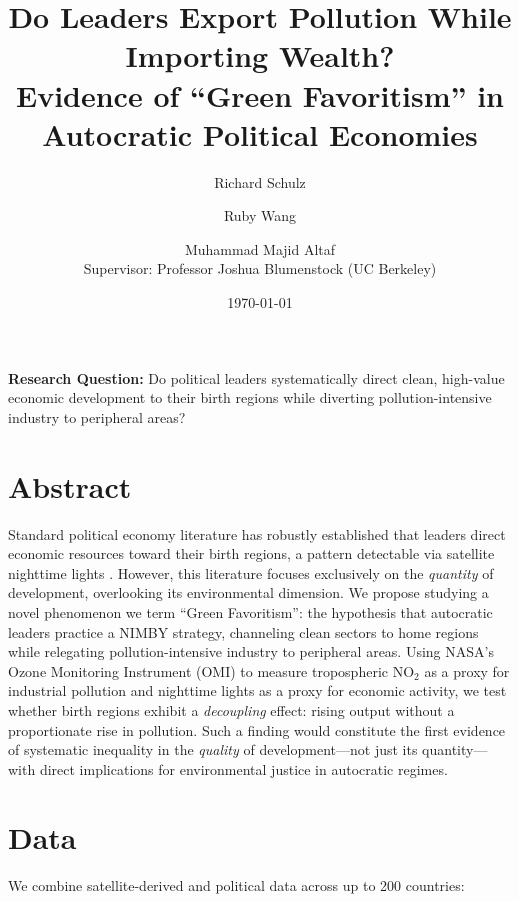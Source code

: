 \documentclass[12pt]{article}
\title{\textbf{Do Leaders Export Pollution While Importing Wealth?}\\[0.5em]
\large Evidence of ``Green Favoritism'' in Autocratic Political Economies}
\author{Richard Schulz \and Ruby Wang \and Muhammad Majid Altaf\\[0.5em]
\small Supervisor: Professor Joshua Blumenstock (UC Berkeley)}
\date{\today}
\begin{document}
\maketitle

\noindent\textbf{Research Question:} Do political leaders systematically direct clean, high-value economic development to their birth regions while diverting pollution-intensive industry to peripheral areas?

\section*{Abstract}

Standard political economy literature has robustly established that leaders direct economic resources toward their birth regions, a pattern detectable via satellite nighttime lights \parencite{HodlerRaschky2014, Bora2025}. However, this literature focuses exclusively on the \textit{quantity} of development, overlooking its environmental dimension. We propose studying a novel phenomenon we term ``Green Favoritism'': the hypothesis that autocratic leaders practice a NIMBY strategy, channeling clean sectors to home regions while relegating pollution-intensive industry to peripheral areas. Using NASA's Ozone Monitoring Instrument (OMI) to measure tropospheric NO$_2$ as a proxy for industrial pollution and nighttime lights as a proxy for economic activity, we test whether birth regions exhibit a \textit{decoupling} effect: rising output without a proportionate rise in pollution. Such a finding would constitute the first evidence of systematic inequality in the \textit{quality} of development---not just its quantity---with direct implications for environmental justice in autocratic regimes.

\section*{Data}

We combine satellite-derived and political data across up to 200 countries:
\end{document}

